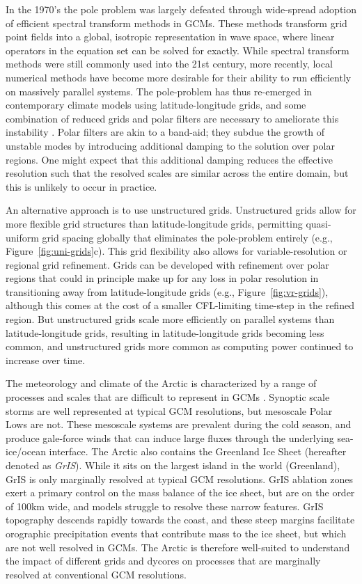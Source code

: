 \documentclass[draft]{agujournal2019}
\begin{document}
In the 1970's the pole problem was largely defeated through wide-spread adoption of efficient spectral transform methods in GCMs. These methods transform grid point fields into a global, isotropic representation in wave space, where linear operators in the equation set can be solved for exactly. While spectral transform methods were still commonly used into the 21st century, more recently, local numerical methods have become more desirable for their ability to run efficiently on massively parallel systems. The pole-problem has thus re-emerged in contemporary climate models using latitude-longitude grids, and some combination of reduced grids and polar filters are necessary to ameliorate this instability \cite{JW2010LNCSE}. Polar filters are akin to a band-aid; they subdue the growth of unstable modes by introducing additional damping to the solution over polar regions. One might expect that this additional damping reduces the effective resolution such that the resolved scales are similar across the entire domain, but this is unlikely to occur in practice.

An alternative approach is to use unstructured grids. Unstructured grids allow for more flexible grid structures than latitude-longitude grids, permitting quasi-uniform grid spacing globally that eliminates the pole-problem entirely (e.g., Figure~\ref{fig:uni-grids}c). This grid flexibility also allows for variable-resolution or regional grid refinement. Grids can be developed with refinement over polar regions that could in principle make up for any loss in polar resolution in transitioning away from latitude-longitude grids (e.g., Figure~\ref{fig:vr-grids}), although this comes at the cost of a smaller CFL-limiting time-step in the refined region. But unstructured grids scale more efficiently on parallel systems than latitude-longitude grids, resulting in latitude-longitude grids becoming less common, and unstructured grids more common as computing power continued to increase over time.

The meteorology and climate of the Arctic is characterized by a range of processes and scales that are difficult to represent in GCMs \cite{BETAL2001MWR,SG2017MWR,VETAL2018TC}. Synoptic scale storms are well represented at typical GCM resolutions, but mesoscale Polar Lows are not. These mesoscale systems are prevalent during the cold season, and produce gale-force winds that can induce large fluxes through the underlying sea-ice/ocean interface. The Arctic also contains the Greenland Ice Sheet (hereafter denoted as \textit{GrIS}). While it sits on the largest island in the world (Greenland), GrIS is only marginally resolved at typical GCM resolutions. GrIS ablation zones exert a primary control on the mass balance of the ice sheet, but are on the order of 100km wide, and models struggle to resolve these narrow features. GrIS topography descends rapidly towards the coast, and these steep margins facilitate orographic precipitation events that contribute mass to the ice sheet, but which are not well resolved in GCMs. The Arctic is therefore well-suited to understand the impact of different grids and dycores on processes that are marginally resolved at conventional GCM resolutions.
\end{document}
